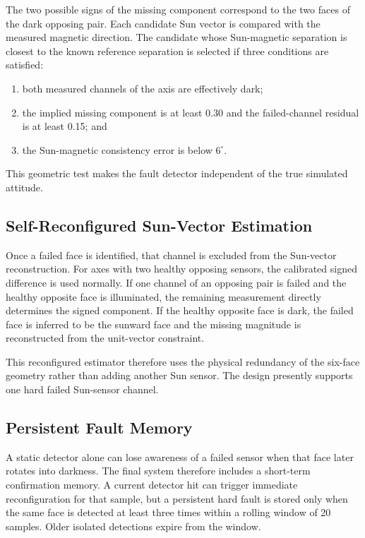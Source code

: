\documentclass[11pt,a4paper]{article}
\begin{document}
The two possible signs of the missing component correspond to the two faces of the dark opposing pair. Each candidate Sun vector is compared with the measured magnetic direction. The candidate whose Sun-magnetic separation is closest to the known reference separation is selected if three conditions are satisfied:
\begin{enumerate}
    \item both measured channels of the axis are effectively dark;
    \item the implied missing component is at least 0.30 and the failed-channel residual is at least 0.15; and
    \item the Sun-magnetic consistency error is below $6^\circ$.
\end{enumerate}

This geometric test makes the fault detector independent of the true simulated attitude.

\subsection{Self-Reconfigured Sun-Vector Estimation}

Once a failed face is identified, that channel is excluded from the Sun-vector reconstruction. For axes with two healthy opposing sensors, the calibrated signed difference is used normally. If one channel of an opposing pair is failed and the healthy opposite face is illuminated, the remaining measurement directly determines the signed component. If the healthy opposite face is dark, the failed face is inferred to be the sunward face and the missing magnitude is reconstructed from the unit-vector constraint.

This reconfigured estimator therefore uses the physical redundancy of the six-face geometry rather than adding another Sun sensor. The design presently supports one hard failed Sun-sensor channel.

\subsection{Persistent Fault Memory}

A static detector alone can lose awareness of a failed sensor when that face later rotates into darkness. The final system therefore includes a short-term confirmation memory. A current detector hit can trigger immediate reconfiguration for that sample, but a persistent hard fault is stored only when the same face is detected at least three times within a rolling window of 20 samples. Older isolated detections expire from the window.
\end{document}
